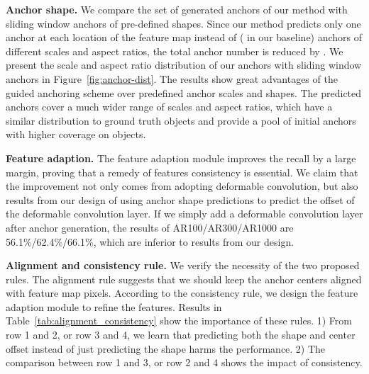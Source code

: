 \documentclass[10pt,twocolumn,letterpaper]{article}
\begin{document}
\noindent
\textbf{Anchor shape.}
We compare the set of generated anchors of our method with sliding window
anchors of pre-defined shapes.
Since our method predicts only one anchor at each location of the feature map
instead of  ( in our baseline) anchors of different scales and
aspect ratios, the total anchor number is reduced by .
We present the scale and aspect ratio distribution of our anchors with
sliding window anchors in Figure~\ref{fig:anchor-dist}.
The results show great advantages of the guided anchoring scheme over
predefined anchor scales and shapes. The predicted anchors cover a much wider
range of scales and aspect ratios, which have a similar distribution to
ground truth objects and provide a pool of initial anchors with higher
coverage on objects.

\noindent
\textbf{Feature adaption.}
The feature adaption module improves the recall by a large margin,
proving that a remedy of features consistency is essential.
We claim that the improvement not only comes from adopting deformable
convolution, but also results from our design of using anchor shape predictions
to predict the offset of the deformable convolution layer.
If we simply add a deformable convolution layer after anchor generation,
the results of AR100/AR300/AR1000 are 56.1\%/62.4\%/66.1\%, which are inferior to
results from our design.

\noindent
\textbf{Alignment and consistency rule.}
We verify the necessity of the two proposed rules.
The alignment rule suggests that we should keep the anchor centers aligned with
feature map pixels.
According to the consistency rule, we design the feature adaption module to
refine the features.
Results in Table~\ref{tab:alignment_consistency} show the importance of these rules.
1) From row 1 and 2, or row 3 and 4, we learn that predicting both the shape
and center offset instead of just predicting the shape harms the performance.
2) The comparison between row 1 and 3, or row 2 and 4 shows the impact of consistency.
\end{document}
